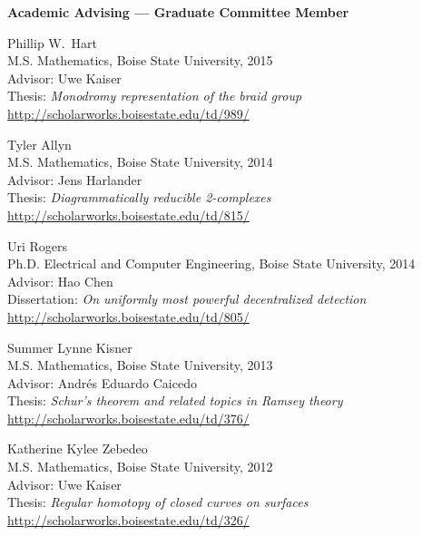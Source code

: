 \documentclass[12pt]{article}
\begin{document}
\textbf{Academic Advising --- Graduate Committee Member}
\begin{description}
\setlength{}

\item[] Phillip W.\ Hart \\
M.S. Mathematics, Boise State University, 2015 \\
Advisor: Uwe Kaiser \\
Thesis: \emph{Monodromy representation of the braid group} \\
\url{http://scholarworks.boisestate.edu/td/989/}

\item[] Tyler Allyn \\
M.S. Mathematics, Boise State University, 2014 \\
Advisor: Jens Harlander \\
Thesis: \emph{Diagrammatically reducible 2-complexes} \\
\url{http://scholarworks.boisestate.edu/td/815/}

\item[] Uri Rogers \\
Ph.D. Electrical and Computer Engineering, Boise State University, 2014 \\
Advisor: Hao Chen \\
Dissertation: \emph{On uniformly most powerful decentralized detection} \\
\url{http://scholarworks.boisestate.edu/td/805/}

\item[] Summer Lynne Kisner \\
M.S. Mathematics, Boise State University, 2013 \\
Advisor: Andr\'es Eduardo Caicedo \\
Thesis: \emph{Schur's theorem and related topics in Ramsey theory} \\
\url{http://scholarworks.boisestate.edu/td/376/}

\item[] Katherine Kylee Zebedeo \\
M.S. Mathematics, Boise State University, 2012 \\
Advisor: Uwe Kaiser \\
Thesis: \emph{Regular homotopy of closed curves on surfaces} \\
\url{http://scholarworks.boisestate.edu/td/326/}
\end{description}
\end{document}
